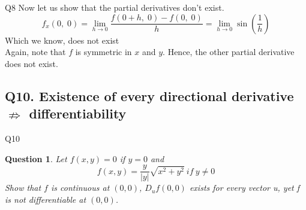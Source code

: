 \documentclass[aspectratio=169]{beamer}
\newtheorem{qsn}{Question}
\begin{document}
\begin{frame}{Q8}
	Now let us show that the partial derivatives don't exist.\\
	\pause
	$$f_x(0,\;0) = \lim_{h\to 0}\frac{f(0 + h,\; 0) - f(0,\;0)}{h} = \lim_{h\to 0}\sin\left(\frac{1}{h}\right)$$
	\pause
	Which we know, does not exist\\[1mm]
	\pause
	Again, note that $f$ is symmetric in $x$ and $y$. Hence, the other partial derivative does not exist.
\end{frame}

\subsection{Q10. Existence of every directional derivative $\nRightarrow$ differentiability}

\begin{frame}{Q10}
   \begin{qsn}
       Let $f(x,y) = 0$ if $y=0$ and 
       $$
        f(x,y) = \frac{y}{|y|} \sqrt{x^2 + y^2}~if~y \ne 0
       $$
       Show that $f$ is continuous at $(0, 0)$, $D_uf(0, 0)$ exists for every vector u, yet f is not differentiable at $(0, 0)$.
   \end{qsn}
\end{frame}
\end{document}
